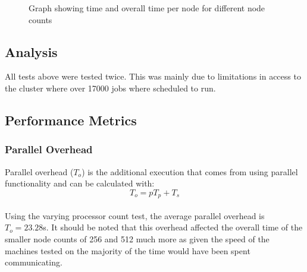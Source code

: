 \documentclass[12pt]{article}
\begin{document}
\label{sec:timevert}
\begin{figure}[h]
\caption{Graph showing time and overall time per node for different node counts}
\begin{center}
\end{center}
\end{figure}



\subsection{Analysis}
All tests above were tested twice. This was mainly due to limitations in access to the cluster where over 17000 jobs where scheduled to run.  

\subsection{Performance Metrics}
\subsubsection{Parallel Overhead}
Parallel overhead (\(T_o\)) is the additional execution that comes from using parallel functionality and can be calculated with:
\[T_o = pT_p + T_s\] \\
Using the varying processor count test, the average parallel overhead is \(T_o = 23.28\)s. It should be noted that this overhead affected the overall time of the smaller node counts of 256 and 512 much more as given the speed of the machines tested on the majority of the time would have been spent communicating. 
\end{document}
